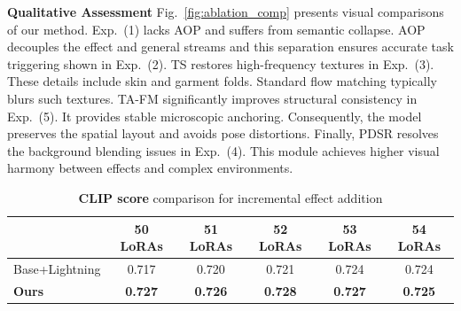 \documentclass{llmxive}
\begin{document}
\noindent
\textbf{Qualitative Assessment}
Fig.~\ref{fig:ablation_comp} presents visual comparisons of our method. Exp.~(1) lacks AOP and suffers from semantic collapse. AOP decouples the effect and general streams and this separation ensures accurate task triggering shown in Exp.~(2). TS restores high-frequency textures in Exp.~(3). These details include skin and garment folds. Standard flow matching typically blurs such textures. TA-FM significantly improves structural consistency in Exp.~(5). It provides stable microscopic anchoring. Consequently, the model preserves the spatial layout and avoids pose distortions. Finally, PDSR resolves the background blending issues in Exp.~(4). This module achieves higher visual harmony between effects and complex environments.


\begin{table}[!t]
\centering
\label{tab:lora_scale}

\caption{\textbf{CLIP Score} comparison across numbers of LoRAs}
\end{table}

\begin{table}[!t]
\centering
\vspace{-0.3cm}
\label{tab:lora_50_to_54}
\begin{tabular}{lccccc}
\toprule
 & 50 LoRAs & 51 LoRAs & 52 LoRAs & 53 LoRAs & 54 LoRAs \\ 
\midrule
Base+Lightning & 0.717 & 0.720 & 0.721 & 0.724 & 0.724 \\ 
\textbf{Ours} & \textbf{0.727} & \textbf{0.726} & \textbf{0.728} & \textbf{0.727} & \textbf{0.725} \\ 
\bottomrule
\end{tabular}%
\vspace{-0.4cm}
\caption{\textbf{CLIP score} comparison for incremental effect addition}
\end{table}
\end{document}
